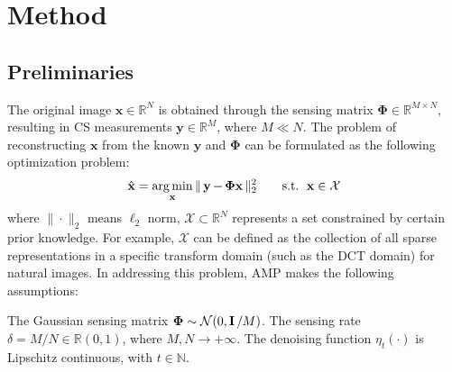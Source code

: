 \documentclass[10pt,twocolumn,letterpaper]{article}
\begin{document}
\section{Method} \label{sec:Method}

\subsection{Preliminaries} \label{subsec:Preliminaries}
The original image $\mathbf{x} \in \mathbb{R}^N$ is obtained through the sensing matrix $\mathbf{\Phi} \in \mathbb{R}^{M \times N}$, resulting in CS measurements $\mathbf{y} \in \mathbb{R}^M$, where $M \ll N$. The problem of reconstructing $\mathbf{x}$ from the known $\mathbf{y}$ and $\mathbf{\Phi}$ can be formulated as the following optimization problem:
\begin{equation}
	\hat{\operatorname{\mathbf{x}} } = \mathop{\arg\min}_{\operatorname{\mathbf{x}}} \| \operatorname{\mathbf{y}} - \operatorname{\mathbf{\Phi x}} \|_2^2 \qquad \text{s.t. } \operatorname{\mathbf{x}} \in \mathcal{X}
\end{equation}
where $\| \cdot \|_2$ means $\ell_2$ norm, $\mathcal{X} \subset \mathbb{R}^N$ represents a set constrained by certain prior knowledge. For example, $\mathcal{X}$ can be defined as the collection of all sparse representations in a specific transform domain (such as the DCT domain) for natural images. In addressing this problem, AMP makes the following assumptions:
\begin{assumption} \label{assum:amp_infty}
	The Gaussian sensing matrix $\mathbf{\Phi} \sim \mathcal{N}(0, \operatorname{\mathbf{I}}/M)$. The sensing rate $\delta = M/N \in \mathbb{R} (0, 1)$, where $M, N \to +\infty$. The denoising function $\eta_t(\cdot)$ is Lipschitz continuous, with $t\in\mathbb{N}$. 
\end{assumption}
\end{document}
